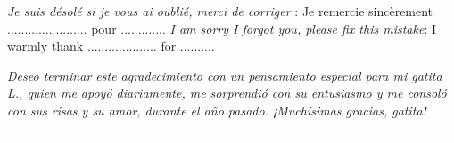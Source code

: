 \begin{acknowledgements}
\vfill{}

\emph{Je suis désolé si je vous ai oublié, merci de corriger} : Je remercie sincèrement ....................... pour .............
\emph{I am sorry I forgot you, please fix this mistake}: I warmly thank .................... for ..........

\vfill{}

%
%
    \emph{Deseo terminar este agradecimiento con un pensamiento especial para mi gatita \emph{L.}, quien me apoyó diariamente, me sorprendió con su entusiasmo y me consoló con sus risas y su amor, durante el año pasado. ¡Muchísimas gracias, gatita!}
    \textcolor{white}{$\heartsuit$ Te quiero, Lola, ¿quieres vivir conmigo?}

\end{acknowledgements}
